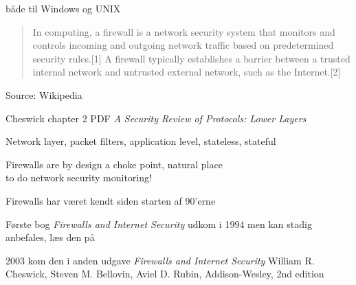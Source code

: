 \documentclass[Screen16to9,17pt]{foils}
\begin{document}


\centerline{}
\centerline{både til Windows og UNIX}






\begin{quote}
In computing, a firewall is a network security system that monitors and controls incoming and outgoing network traffic based on predetermined security rules.[1] A firewall typically establishes a barrier between a trusted internal network and untrusted external network, such as the Internet.[2]
\end{quote} Source: Wikipedia

\begin{list1}
\item {}
\item {} Cheswick chapter 2 PDF
\emph{A Security Review of Protocols:
Lower Layers}
\begin{list2}
\item Network layer, packet filters, application level, stateless, stateful
\end{list2}
\end{list1}

\Large Firewalls are by design a choke point, natural place \\
to do network security monitoring!




\begin{list1}
\item Firewalls har været kendt siden starten af 90'erne
\item Første bog \emph{Firewalls and Internet Security} udkom i 1994 men kan stadig anbefales, læs den på 

\item 2003 kom den i anden udgave \emph{Firewalls and Internet Security}
William R. Cheswick, Steven M. Bellovin, Aviel D. Rubin,
Addison-Wesley, 2nd edition
\end{list1}
\end{document}

